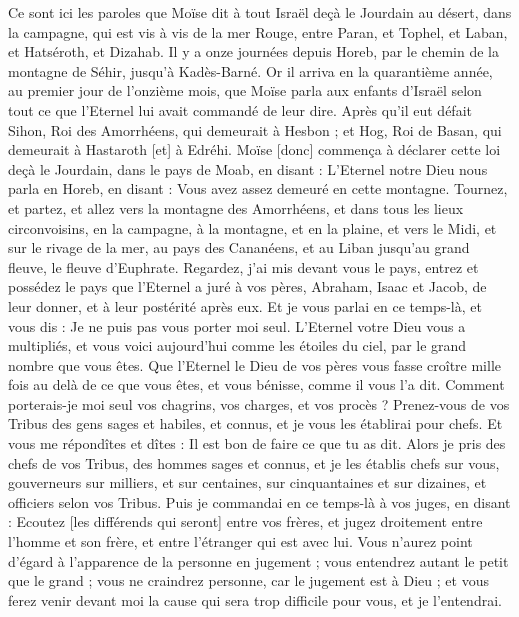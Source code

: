 \BFont
\begin{multicols}{2}
\VerseOne{}Ce sont ici les paroles que Moïse dit à tout Israël deçà le Jourdain au désert, dans la campagne, qui est vis à vis de la mer Rouge, entre Paran, et Tophel, et Laban, et Hatséroth, et Dizahab.
Il y a onze journées depuis Horeb, par le chemin de la montagne de Séhir, jusqu'à Kadès-Barné.
Or il arriva en la quarantième année, au premier jour de l'onzième mois, que Moïse parla aux enfants d'Israël selon tout ce que l'Eternel lui avait commandé de leur dire.
Après qu'il eut défait Sihon, Roi des Amorrhéens, qui demeurait à Hesbon ; et Hog, Roi de Basan, qui demeurait à Hastaroth [et] à Edréhi.
Moïse [donc] commença à déclarer cette loi deçà le Jourdain, dans le pays de Moab, en disant :
L'Eternel notre Dieu nous parla en Horeb, en disant : Vous avez assez demeuré en cette montagne.
Tournez, et partez, et allez vers la montagne des Amorrhéens, et dans tous les lieux circonvoisins, en la campagne, à la montagne, et en la plaine, et vers le Midi, et sur le rivage de la mer, au pays des Cananéens, et au Liban jusqu'au grand fleuve, le fleuve d'Euphrate.
Regardez, j'ai mis devant vous le pays, entrez et possédez le pays que l'Eternel a juré à vos pères, Abraham, Isaac et Jacob, de leur donner, et à leur postérité après eux.
Et je vous parlai en ce temps-là, et vous dis : Je ne puis pas vous porter moi seul.
L'Eternel votre Dieu vous a multipliés, et vous voici aujourd'hui comme les étoiles du ciel, par le grand nombre que vous êtes.
Que l'Eternel le Dieu de vos pères vous fasse croître mille fois au delà de ce que vous êtes, et vous bénisse, comme il vous l'a dit.
Comment porterais-je moi seul vos chagrins, vos charges, et vos procès ?
Prenez-vous de vos Tribus des gens sages et habiles, et connus, et je vous les établirai pour chefs.
Et vous me répondîtes et dîtes : Il est bon de faire ce que tu as dit.
Alors je pris des chefs de vos Tribus, des hommes sages et connus, et je les établis chefs sur vous, gouverneurs sur milliers, et sur centaines, sur cinquantaines et sur dizaines, et officiers selon vos Tribus.
Puis je commandai en ce temps-là à vos juges, en disant : Ecoutez [les différends qui seront] entre vos frères, et jugez droitement entre l'homme et son frère, et entre l'étranger qui est avec lui.
Vous n'aurez point d'égard à l'apparence de la personne en jugement ; vous entendrez autant le petit que le grand ; vous ne craindrez personne, car le jugement est à Dieu ; et vous ferez venir devant moi la cause qui sera trop difficile pour vous, et je l'entendrai.

\end{multicols}

